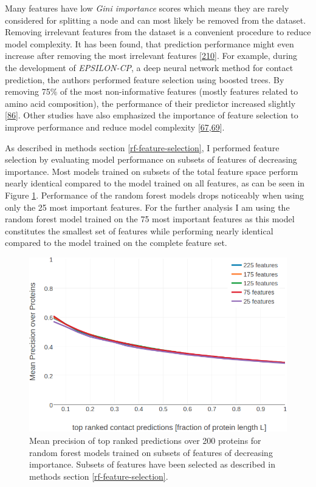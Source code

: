 \documentclass[11pt,a4paper,twoside]{book}
\theoremstyle{definition}
\theoremstyle{definition}
\theoremstyle{remark}
\begin{document}
Many features have low \emph{Gini importance} scores which means they
are rarely considered for splitting a node and can most likely be
removed from the dataset. Removing irrelevant features from the dataset
is a convenient procedure to reduce model complexity. It has been found,
that prediction performance might even increase after removing the most
irrelevant features {[}\protect\hyperlink{ref-Menze2009}{210}{]}. For
example, during the development of \emph{EPSILON-CP}, a deep neural
network method for contact prediction, the authors performed feature
selection using boosted trees. By removing 75\% of the most
non-informative features (mostly features related to amino acid
composition), the performance of their predictor increased slightly
{[}\protect\hyperlink{ref-Stahl2017}{86}{]}. Other studies have also
emphasized the importance of feature selection to improve performance
and reduce model complexity
{[}\protect\hyperlink{ref-Cheng2007}{67},\protect\hyperlink{ref-Li2011}{69}{]}.

As described in methods section \ref{rf-feature-selection}, I performed
feature selection by evaluating model performance on subsets of features
of decreasing importance. Most models trained on subsets of the total
feature space perform nearly identical compared to the model trained on
all features, as can be seen in Figure
\ref{fig:rf-feature-selection-performance}. Performance of the random
forest models drops noticeably when using only the 25 most important
features. For the further analysis I am using the random forest model
trained on the 75 most important features as this model constitutes the
smallest set of features while performing nearly identical compared to
the model trained on the complete feature set.







\begin{figure}
\includegraphics[width=1\linewidth]{img/random_forest_contact_prior/precision_vs_rank_featureselection_random_forest_optimized_hyperparameters} \caption{Mean precision of top
ranked predictions over 200 proteins for random forest models trained on
subsets of features of decreasing importance. Subsets of features have
been selected as described in methods section
\ref{rf-feature-selection}.}\label{fig:rf-feature-selection-performance}
\end{figure}
\end{document}
